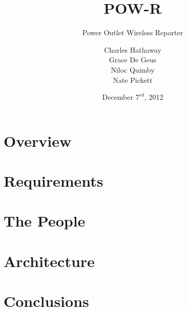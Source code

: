 \documentclass[compress]{beamer}
\title{POW-R}
\subtitle{Power Outlet Wireless Reporter}
\author[Innotek]{Charles Hathaway\\Grace De Geus\\Niloc Quimby\\Nate Pickett}
\date{December $7^{rd}$, 2012}
\begin{document}
\frame{
    \titlepage
}

\section[Outline]{}


\section{Overview}



\section{Requirements}

\section{The People}

%





\section{Architecture}






\section{Conclusions}


\end{document}
